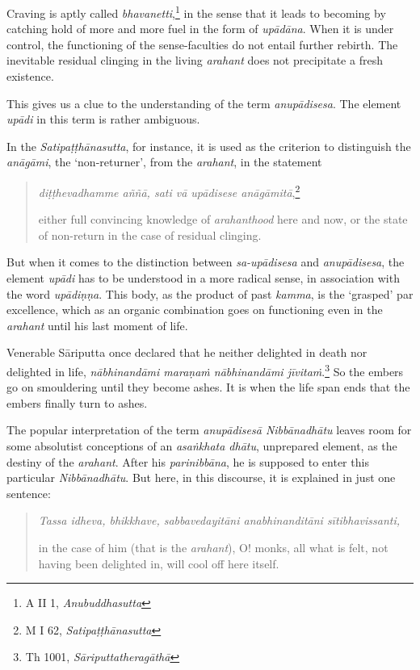 Craving is aptly called \emph{bhavanetti},\footnote{A II 1, \emph{Anubuddhasutta}} in the sense that it leads to becoming by catching hold of more and more fuel in the form of \emph{upādāna}. When it is under control, the functioning of the sense-faculties do not entail further rebirth. The inevitable residual clinging in the living \emph{arahant} does not precipitate a fresh existence.

This gives us a clue to the understanding of the term \emph{anupādisesa}. The element \emph{upādi} in this term is rather ambiguous.

In the \emph{Satipaṭṭhānasutta}, for instance, it is used as the criterion to distinguish the \emph{anāgāmi}, the `non-returner', from the \emph{arahant}, in the statement

\begin{quote}
\emph{diṭṭhevadhamme aññā, sati vā upādisese anāgāmitā},\footnote{M I 62, \emph{Satipaṭṭhānasutta}}

either full convincing knowledge of \emph{arahanthood} here and now, or the state of non-return in the case of residual clinging.
\end{quote}

But when it comes to the distinction between \emph{sa-upādisesa} and \emph{anupādisesa}, the element \emph{upādi} has to be understood in a more radical sense, in association with the word \emph{upādiṇṇa}. This body, as the product of past \emph{kamma}, is the `grasped' par excellence, which as an organic combination goes on functioning even in the \emph{arahant} until his last moment of life.

Venerable Sāriputta once declared that he neither delighted in death nor delighted in life, \emph{nābhinandāmi maraṇaṁ nābhinandāmi jīvitaṁ}.\footnote{Th 1001, \emph{Sāriputtatheragāthā}} So the embers go on smouldering until they become ashes. It is when the life span ends that the embers finally turn to ashes.

The popular interpretation of the term \emph{anupādisesā Nibbānadhātu} leaves room for some absolutist conceptions of an \emph{asaṅkhata dhātu}, unprepared element, as the destiny of the \emph{arahant}. After his \emph{parinibbāna}, he is supposed to enter this particular \emph{Nibbānadhātu}. But here, in this discourse, it is explained in just one sentence:

\begin{quote}
\emph{Tassa idheva, bhikkhave, sabbavedayitāni anabhinanditāni sītibhavissanti,}

in the case of him (that is the \emph{arahant}), O! monks, all what is felt, not having been delighted in, will cool off here itself.
\end{quote}

